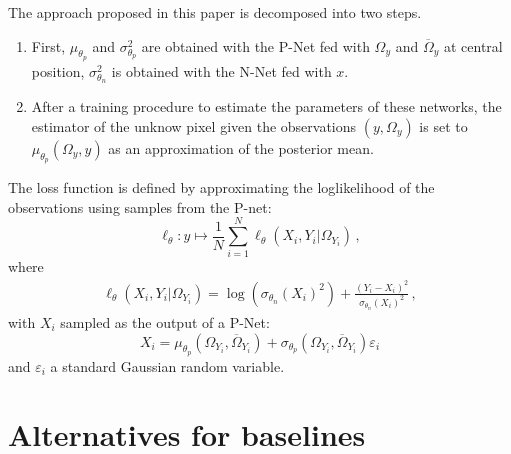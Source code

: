 \documentclass[review]{cvpr}
\begin{document}
The approach proposed in this paper is decomposed into two steps.
\begin{enumerate}
\item First, $\mu_{\theta_p}$ and $\sigma_{\theta_p}^2$  are obtained with the P-Net fed with $\Omega_y$ and $\overline \Omega_y$ at central position, $\sigma_{\theta_n}^2$ is  obtained with the N-Net fed with $x$.
\item After a training procedure to estimate the parameters of these networks, the estimator of the unknow pixel given the observations $(y,\Omega_y)$ is set to $\mu_{\theta_p}(\Omega_y,y)$ as an approximation of the posterior mean.
\end{enumerate}
The loss function is defined by approximating the loglikelihood of the observations using samples from the P-net:
$$
\ell_{\theta}: y \mapsto \frac{1}{N}\sum_{i=1}^N \ell_{\theta}(X_i,Y_i|\Omega_{Y_i})\,,
$$
where
\begin{multline*}
\ell_{\theta}(X_i,Y_i|\Omega_{Y_i}) = \log(\sigma_{\theta_n}(X_i)^2) + \frac{(Y_i-X_i)^2}{\sigma_{\theta_n}(X_i)^2} \,,
\end{multline*}
with $X_i$ sampled as the output of a P-Net:
$$
X_ i = \mu_{\theta_p}(\Omega_{Y_i},\overline \Omega_{Y_i}) + \sigma_{\theta_p}(\Omega_{Y_i},\overline \Omega_{Y_i})\varepsilon_i
$$
and $\varepsilon_i$ a standard Gaussian random variable.
\section{Alternatives for baselines}
\end{document}
